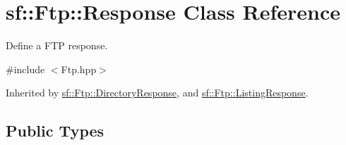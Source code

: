 \hypertarget{classsf_1_1_ftp_1_1_response}{\section{sf\+:\+:Ftp\+:\+:Response Class Reference}
\label{classsf_1_1_ftp_1_1_response}
}


Define a F\+T\+P response.  




{\ttfamily \#include $<$Ftp.\+hpp$>$}



Inherited by \hyperlink{classsf_1_1_ftp_1_1_directory_response}{sf\+::\+Ftp\+::\+Directory\+Response}, and \hyperlink{classsf_1_1_ftp_1_1_listing_response}{sf\+::\+Ftp\+::\+Listing\+Response}.

\subsection*{Public Types}
